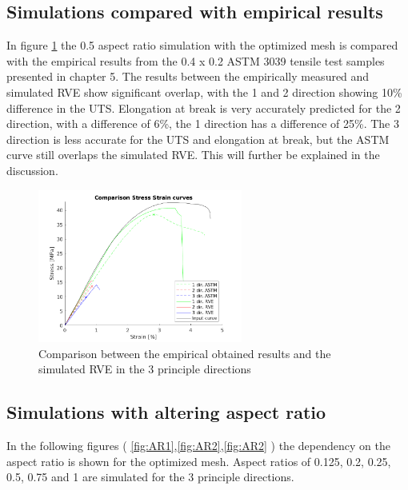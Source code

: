 \subsection{Simulations compared with empirical results }
In figure \ref{fig:ComparisonSS} the 0.5 aspect ratio simulation with the optimized mesh is compared with the empirical results from the 0.4 x 0.2 ASTM 3039 tensile test samples presented in chapter 5. The results between the empirically measured and simulated RVE show significant overlap, with the 1 and 2 direction showing 10\% difference in the UTS. Elongation at break is very accurately predicted for the 2 direction, with a difference of 6\%, the 1 direction has a difference of 25\%. The 3 direction is less accurate for the UTS and elongation at break, but the ASTM curve still overlaps the simulated RVE. This will further be explained in the discussion.

\begin{figure}[H]
    \centering
    \includegraphics[width=0.60\textwidth]{chapter_7_non-elasticmodelling/figures/ComparisonSS.png}
    \caption{Comparison between the empirical obtained results and the simulated RVE in the 3 principle directions}
    \label{fig:ComparisonSS}
\end{figure}

\subsection{Simulations with altering aspect ratio}
In the following figures ( \ref{fig:AR1},\ref{fig:AR2},\ref{fig:AR2} ) the dependency on the aspect ratio is shown for the optimized mesh. Aspect ratios of 0.125, 0.2, 0.25, 0.5, 0.75 and 1 are simulated for the 3 principle directions. 

